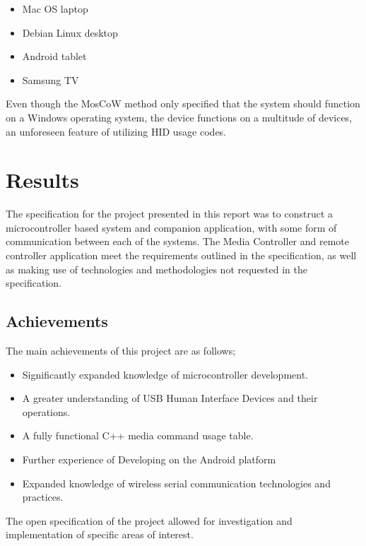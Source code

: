 \documentclass{article}
\begin{document}
		\begin{itemize}
			\item Mac OS laptop
			\item Debian Linux desktop
			\item Android tablet
			\item Samsung TV
		\end{itemize}
		
		\noindent
		Even though the MosCoW method only specified that the system should function on a Windows operating system, the device functions on a multitude of devices, an unforeseen feature of utilizing HID usage codes.
			
	\newpage
	
	\section{Results}
		The specification for the project presented in this report was to construct a microcontroller based system and companion application, with some form of communication between each of the systems. The Media Controller and remote controller application meet the requirements outlined in the specification, as well as making use of technologies and methodologies not requested in the specification.
			
		\subsection{Achievements}
			The main achievements of this project are as follows;
			
			\begin{itemize}
				\item Significantly expanded knowledge of microcontroller development.
				\item A greater understanding of USB Human Interface Devices and their operations.
				\item A fully functional C++ media command usage table.
				\item Further experience of Developing on the Android platform
				\item Expanded knowledge of wireless serial communication technologies and practices.
			\end{itemize}
			
			\noindent
			The open specification of the project allowed for investigation and implementation of specific areas of interest. 
			
\end{document}

